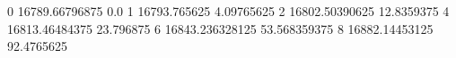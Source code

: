 0 16789.66796875 0.0
1 16793.765625 4.09765625
2 16802.50390625 12.8359375
4 16813.46484375 23.796875
6 16843.236328125 53.568359375
8 16882.14453125 92.4765625
